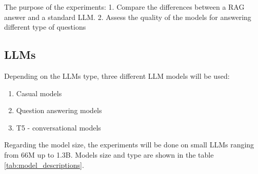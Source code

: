 \documentclass{wseas}
\begin{document}
The purpose of the experiments: 1. Compare the differences between a RAG
answer and a standard LLM. 2. Assess the quality of the models for
answering different type of questions

\subsection{LLMs}

Depending on the LLMs type, three different LLM models will be used:

\begin{enumerate}
\def\labelenumi{\arabic{enumi}.}
\item
  Casual models
\item
  Question answering models
\item
  T5 - conversational models
\end{enumerate}

Regarding the model size, the experiments will be done on small LLMs
ranging from 66M up to 1.3B. Models size and type are shown in the table \ref{tab:model_descriptions}.


\end{document}
